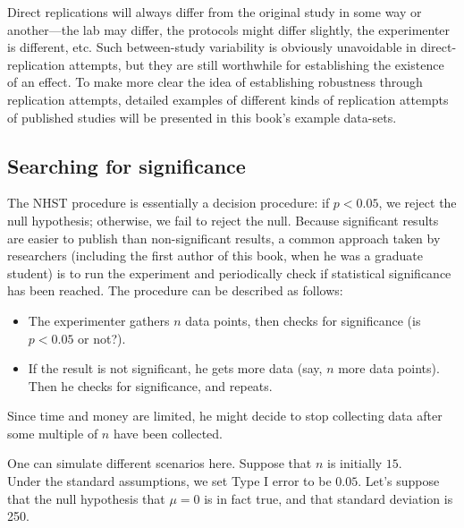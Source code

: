 \documentclass[12pt,]{krantz}
\providecommand{\tightlist}{%
  \setlength{\itemsep}{0pt}\setlength{\parskip}{0pt}}
\begin{document}
Direct replications will always differ from the original study in some way or another---the lab may differ, the protocols might differ slightly, the experimenter is different, etc. Such between-study variability is obviously unavoidable in direct-replication attempts, but they are still worthwhile for establishing the existence of an effect. To make more clear the idea of establishing robustness through replication attempts, detailed examples of different kinds of replication attempts of published studies will be presented in this book's example data-sets.

\hypertarget{searching-for-significance}{%
\subsection{Searching for significance}\label{searching-for-significance}}

The NHST procedure is essentially a decision procedure: if \(p<0.05\), we reject the null hypothesis; otherwise, we fail to reject the null. Because significant results are easier to publish than non-significant results, a common approach taken by researchers (including the first author of this book, when he was a graduate student) is to run the experiment and periodically check if statistical significance has been reached. The procedure can be described as follows:

\begin{itemize}
\tightlist
\item
  The experimenter gathers \(n\) data points, then checks for significance (is \(p<0.05\) or not?).
\item
  If the result is not significant, he gets more data (say, \(n\) more data points). Then he checks for significance, and repeats.
\end{itemize}

Since time and money are limited, he might decide to stop collecting data after some multiple of \(n\) have been collected.

One can simulate different scenarios here. Suppose that \(n\) is initially \(15\).\\
Under the standard assumptions, we set Type I error to be \(0.05\). Let's suppose that the null hypothesis that \(\mu=0\) is in fact true, and that standard deviation is 250.
\end{document}
